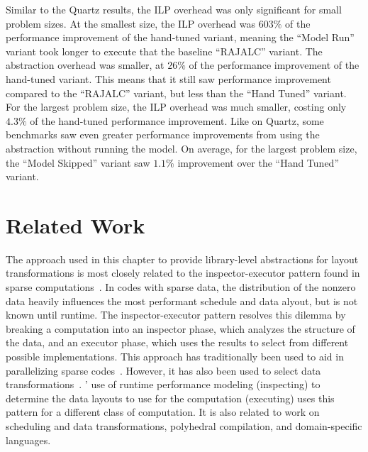Similar to the Quartz results, the ILP overhead was only significant for small problem sizes.
At the smallest size, the ILP overhead was $603\%$ of the performance improvement of the hand-tuned variant, meaning the ``Model Run'' variant took longer to execute that the baseline ``RAJALC'' variant.
The abstraction overhead was smaller, at $26\%$ of the performance improvement of the hand-tuned variant.
This means that it still saw performance improvement compared to the ``RAJALC'' variant, but less than the ``Hand Tuned'' variant.
For the largest problem size, the ILP overhead was much smaller, costing only $4.3\%$ of the hand-tuned performance improvement.
Like on Quartz, some benchmarks saw even greater performance improvements from using the \FormatDecisions{} abstraction without running the model.
On average, for the largest problem size, the ``Model Skipped'' variant saw $1.1\%$ improvement over the ``Hand Tuned'' variant.

\section{Related Work}

The approach used in this chapter to provide library-level abstractions for layout transformations is most closely related to the inspector-executor pattern found in sparse computations~\cite{strout2018sparse}.
In codes with sparse data, the distribution of the nonzero data heavily influences the most performant schedule and data alyout, but is not known until runtime.
The inspector-executor pattern resolves this dilemma by breaking a computation into an inspector phase, which analyzes the structure of the data, and an executor phase, which uses the results to select from different possible implementations.
This approach has traditionally been used to aid in parallelizing sparse codes~\cite{ujaldon1996parallelization,fu1996run,venkat2016automating}.
However, it has also been used to select data transformations~\cite{venkat2015loop}.
\FormatDecisions' use of runtime performance modeling (inspecting) to determine the data layouts to use for the computation (executing) uses this pattern for a different class of computation.
It is also related to work on scheduling and data transformations, polyhedral compilation, and domain-specific languages.


